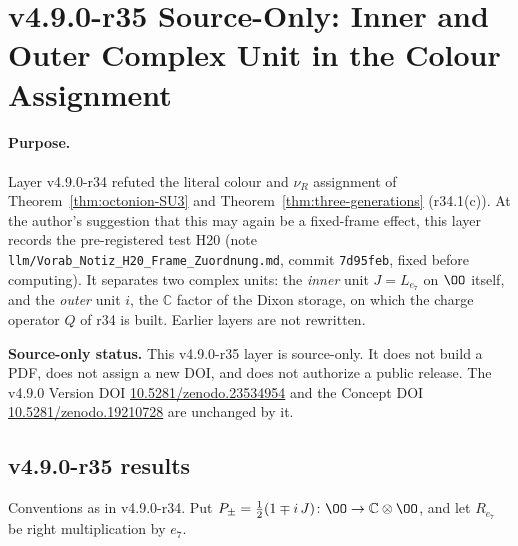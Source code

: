 \clearpage
\section*{v4.9.0-r35 Source-Only: Inner and Outer Complex Unit in the Colour Assignment}
\label{sec:v490-r35-inner-outer-unit}

\paragraph{Purpose.}
Layer v4.9.0-r34 refuted the literal colour and \(\nu_R\) assignment of Theorem~\ref{thm:octonion-SU3} and
Theorem~\ref{thm:three-generations} (r34.1(c)).  At the author's suggestion that this may again be a fixed-frame effect, this layer
records the pre-registered test H20 (note \texttt{llm/Vorab\_Notiz\_H20\_Frame\_Zuordnung.md}, commit \texttt{7d95feb}, fixed before
computing).  It separates two complex units: the \emph{inner} unit \(J=L_{e_7}\) on \(\OO\) itself, and the \emph{outer} unit \(i\),
the \(\mathbb C\) factor of the Dixon storage, on which the charge operator \(Q\) of r34 is built.  Earlier layers are not rewritten.

\noindent\textbf{Source-only status.}
This v4.9.0-r35 layer is source-only.  It does not build a PDF, does not assign a new DOI,
and does not authorize a public release.  The v4.9.0 Version DOI
\href{https://doi.org/10.5281/zenodo.23534954}{10.5281/zenodo.23534954} and the Concept DOI
\href{https://doi.org/10.5281/zenodo.19210728}{10.5281/zenodo.19210728} are unchanged by it.

\subsection*{v4.9.0-r35 results}
\label{subsec:v490-r35-results}

Conventions as in v4.9.0-r34.  Put \(P_\pm=\tfrac12(1\mp i\,J)\colon\OO\to\mathbb C\otimes\OO\), and let \(R_{e_7}\) be right
multiplication by \(e_7\).

